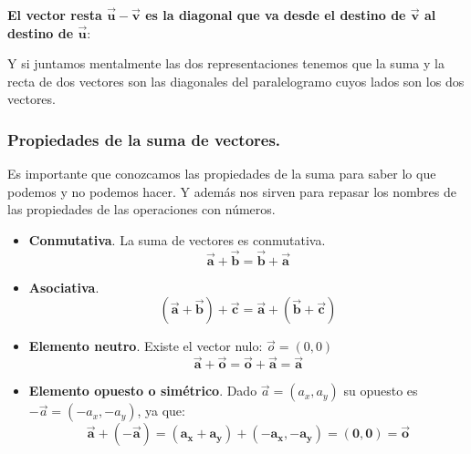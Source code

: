 \documentclass[a4paper,11pt,answers]{exam}
\begin{document}
\textbf{El vector resta $\boldsymbol{\vec{u} - \vec{v}}$ es la diagonal que va desde el destino de
  $\boldsymbol{\vec{v}}$ al destino de $\boldsymbol{\vec{u}}$}:
\begin{center}
\end{center}

Y si juntamos mentalmente las dos representaciones tenemos que la suma y la recta de dos
vectores son las diagonales del paralelogramo cuyos lados son los dos vectores.

\subsubsection{Propiedades de la suma de vectores.}
Es importante que conozcamos las propiedades de la suma para saber lo que podemos y no podemos
hacer. Y además nos sirven para repasar los nombres de las propiedades de las operaciones
con números.
\begin{itemize}
\item \textbf{Conmutativa}. La suma de vectores es conmutativa.
  \[\boldsymbol{\vec{a} + \vec{b} = \vec{b} + \vec{a}}\]
\item \textbf{Asociativa}.
  \[\boldsymbol{(\vec{a} + \vec{b}) + \vec{c} = \vec{a} + (\vec{b} + \vec{c})}\]
\item \textbf{Elemento neutro}. Existe el vector nulo: $\vec{o} = (0,0)$
  \[\boldsymbol{\vec{a} + \vec{o} = \vec{o} + \vec{a} = \vec{a}}\]
\item \textbf{Elemento opuesto o simétrico}. Dado $\vec{a} = (a_x, a_y)$ su opuesto es
  $-\vec{a} = (-a_x, -a_y)$, ya que:
  \[\boldsymbol{\vec{a} + (-\vec{a}) = (a_x + a_y) + (-a_x, -a_y) = (0,0) = \vec{o}}\]
\end{itemize}
\end{document}
